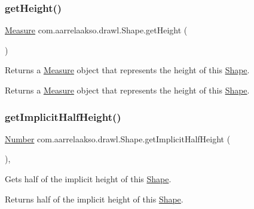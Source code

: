 \subsubsection{\texorpdfstring{get\+Height()}{getHeight()}}
{\footnotesize\ttfamily \hyperlink{classcom_1_1aarrelaakso_1_1drawl_1_1_measure}{Measure} com.\+aarrelaakso.\+drawl.\+Shape.\+get\+Height (\begin{DoxyParamCaption}{ }\end{DoxyParamCaption})\hspace{0.3cm}{\ttfamily [inherited]}}



Returns a \hyperlink{classcom_1_1aarrelaakso_1_1drawl_1_1_measure}{Measure} object that represents the height of this \hyperlink{classcom_1_1aarrelaakso_1_1drawl_1_1_shape}{Shape}. 

\begin{DoxyReturn}{Returns}
a \hyperlink{classcom_1_1aarrelaakso_1_1drawl_1_1_measure}{Measure} object that represents the height of this \hyperlink{classcom_1_1aarrelaakso_1_1drawl_1_1_shape}{Shape}. 
\end{DoxyReturn}
\mbox{\label{classcom_1_1aarrelaakso_1_1drawl_1_1_shape_a4af0fd7e309ea01bced73076510ef897}} 
\subsubsection{\texorpdfstring{get\+Implicit\+Half\+Height()}{getImplicitHalfHeight()}}
{\footnotesize\ttfamily \hyperlink{interfacecom_1_1aarrelaakso_1_1drawl_1_1_number}{Number} com.\+aarrelaakso.\+drawl.\+Shape.\+get\+Implicit\+Half\+Height (\begin{DoxyParamCaption}{ }\end{DoxyParamCaption})\hspace{0.3cm}{\ttfamily [protected]}, {\ttfamily [inherited]}}



Gets half of the implicit height of this \hyperlink{classcom_1_1aarrelaakso_1_1drawl_1_1_shape}{Shape}. 

\begin{DoxyReturn}{Returns}
half of the implicit height of this \hyperlink{classcom_1_1aarrelaakso_1_1drawl_1_1_shape}{Shape}. 
\end{DoxyReturn}
\mbox{\label{classcom_1_1aarrelaakso_1_1drawl_1_1_shape_a02d73887a309bcd1178b142ad0c7edd9}} 
